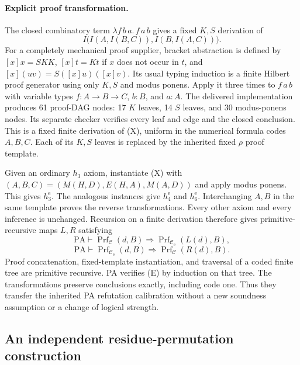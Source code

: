 \paragraph{Explicit proof transformation.}
The closed combinatory term $\lambda f\,b\,a.\,f\,a\,b$ gives a fixed
$K,S$ derivation of
\[
 I\bigl(I(A,I(B,C)), I(B,I(A,C))\bigr).                 \tag{X}
\]
For a completely mechanical proof supplier, bracket abstraction is defined
by $[x]x=SKK$, $[x]t=Kt$ if $x$ does not occur in $t$, and
$[x](uv)=S([x]u)([x]v)$.  Its usual typing induction is a finite Hilbert
proof generator using only $K,S$ and modus ponens.  Apply it three times to
$f\,a\,b$ with variable types $f:A\to B\to C$, $b:B$, and $a:A$.
The delivered implementation produces 61 proof-DAG nodes: 17 $K$ leaves,
14 $S$ leaves, and 30 modus-ponens nodes. Its separate checker verifies
every leaf and edge and the closed conclusion. This is a fixed finite
derivation of (X), uniform in the numerical formula codes $A,B,C$.  Each of its $K,S$ leaves is replaced by the inherited
fixed $\rho$ proof template.

Given an ordinary $h_3$ axiom, instantiate (X) with
$(A,B,C)=(M(H,D),E(H,A),M(A,D))$ and apply modus ponens.  This gives
$h_3^{\mathrm e}$.  The analogous instances give $h_4^{\mathrm e}$ and
$h_6^{\mathrm e}$.  Interchanging $A,B$ in the same template proves the
reverse transformations.  Every other axiom and every inference is
unchanged.  Recursion on a finite derivation therefore gives
primitive-recursive maps $L,R$ satisfying
\[
 \mathrm{PA}\vdash
 \operatorname{Prf}_{\mathcal C}(d,B)
   \Longrightarrow\operatorname{Prf}_{\mathcal C_{\mathrm e}}(L(d),B),
\]
\[
 \mathrm{PA}\vdash
 \operatorname{Prf}_{\mathcal C_{\mathrm e}}(d,B)
   \Longrightarrow\operatorname{Prf}_{\mathcal C}(R(d),B).
                                                               \tag{E}
\]
Proof concatenation, fixed-template instantiation, and traversal of a coded
finite tree are primitive recursive.  PA verifies (E) by induction on that
tree.  The transformations preserve conclusions exactly, including code
one.  Thus they transfer the inherited PA refutation calibration without a
new soundness assumption or a change of logical strength.

\subsection{An independent residue-permutation construction}
\label{sec:residue-permutation}

